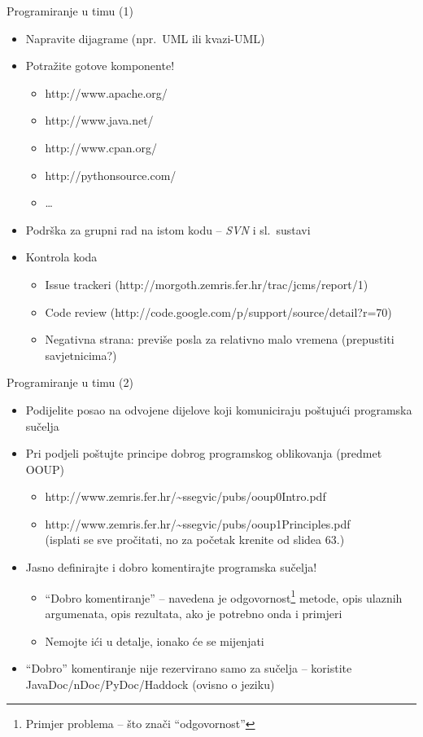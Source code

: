 \documentclass{beamer}
\begin{document}
\begin{frame}[t]{Programiranje u timu (1)}
\begin{itemize}
  \item Napravite dijagrame (npr.~UML ili kvazi-UML)
  \item Potražite gotove komponente!
  \begin{itemize}
    \item http://www.apache.org/
    \item http://www.java.net/
    \item http://www.cpan.org/
    \item http://pythonsource.com/
    \item \ldots
  \end{itemize}
  \item Podrška za grupni rad na istom kodu -- \emph{SVN} i sl.~sustavi
  \item Kontrola koda
  \begin{itemize}
    \item Issue trackeri (http://morgoth.zemris.fer.hr/trac/jcms/report/1)
    \item Code review (http://code.google.com/p/support/source/detail?r=70)
    \item Negativna strana: previše posla za relativno malo vremena (prepustiti
    savjetnicima?)
  \end{itemize} 
\end{itemize}
\end{frame}

\begin{frame}[t]{Programiranje u timu (2)}
\begin{itemize}
  \item Podijelite posao na odvojene dijelove koji komuniciraju poštujući
  programska sučelja
  \item Pri podjeli poštujte principe dobrog programskog oblikovanja (predmet
  OOUP)
  \begin{itemize}
  	\item http://www.zemris.fer.hr/\textasciitilde ssegvic/pubs/ooup0Intro.pdf
  	\item http://www.zemris.fer.hr/\textasciitilde ssegvic/pubs/ooup1Principles.pdf\\
  	(isplati se sve pročitati, no za početak krenite od slidea $63$.)
  \end{itemize}
  \item Jasno definirajte i dobro komentirajte programska sučelja!
  \begin{itemize}
    \item ``Dobro komentiranje'' -- navedena je odgovornost\footnote{Primjer
    problema -- što znači ``odgovornost''} metode, opis ulaznih argumenata,
    opis rezultata, ako je potrebno onda i primjeri
    \item Nemojte ići u detalje, ionako će se mijenjati
  \end{itemize}
  \item ``Dobro'' komentiranje nije rezervirano samo za sučelja -- koristite
  JavaDoc/nDoc/PyDoc/Haddock (ovisno o jeziku)
\end{itemize}
\end{frame}
\end{document}
